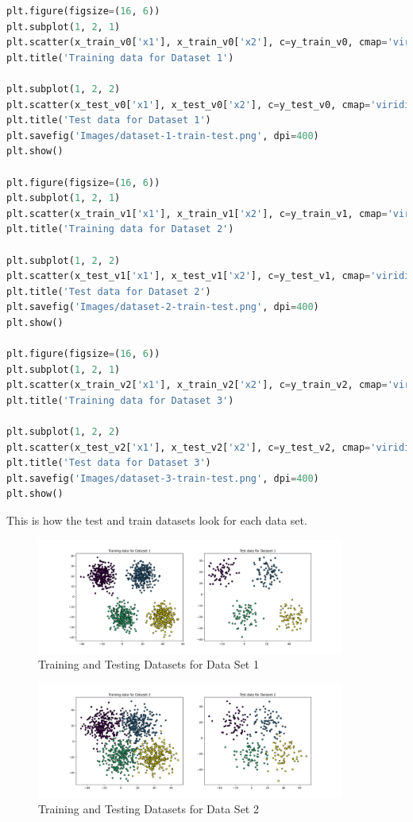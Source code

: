 \begin{lstlisting}[language=Python, caption=Plotting the Training and Testing Datasets]
plt.figure(figsize=(16, 6))
plt.subplot(1, 2, 1)
plt.scatter(x_train_v0['x1'], x_train_v0['x2'], c=y_train_v0, cmap='viridis', s=10)
plt.title('Training data for Dataset 1')

plt.subplot(1, 2, 2)
plt.scatter(x_test_v0['x1'], x_test_v0['x2'], c=y_test_v0, cmap='viridis', s=10)
plt.title('Test data for Dataset 1')
plt.savefig('Images/dataset-1-train-test.png', dpi=400)
plt.show()

plt.figure(figsize=(16, 6))
plt.subplot(1, 2, 1)
plt.scatter(x_train_v1['x1'], x_train_v1['x2'], c=y_train_v1, cmap='viridis', s=10)
plt.title('Training data for Dataset 2')

plt.subplot(1, 2, 2)
plt.scatter(x_test_v1['x1'], x_test_v1['x2'], c=y_test_v1, cmap='viridis', s=10)
plt.title('Test data for Dataset 2')
plt.savefig('Images/dataset-2-train-test.png', dpi=400)
plt.show()

plt.figure(figsize=(16, 6))
plt.subplot(1, 2, 1)
plt.scatter(x_train_v2['x1'], x_train_v2['x2'], c=y_train_v2, cmap='viridis', s=10)
plt.title('Training data for Dataset 3')

plt.subplot(1, 2, 2)
plt.scatter(x_test_v2['x1'], x_test_v2['x2'], c=y_test_v2, cmap='viridis', s=10)
plt.title('Test data for Dataset 3')
plt.savefig('Images/dataset-3-train-test.png', dpi=400)
plt.show()
\end{lstlisting}

\clearpage

This is how the test and train datasets look for each data set.

\begin{figure}[H]
    \centering
    \includegraphics[width=0.9\textwidth]{Images/dataset-1-train-test.png}
    \caption{Training and Testing Datasets for Data Set 1}
\end{figure}

\begin{figure}[H]
    \centering
    \includegraphics[width=0.9\textwidth]{Images/dataset-2-train-test.png}
    \caption{Training and Testing Datasets for Data Set 2}
\end{figure}

